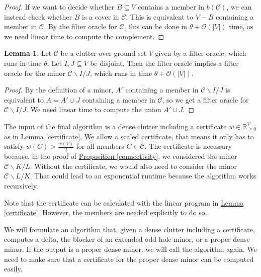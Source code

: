 \documentclass[a4paper, 12pt]{scrbook}
\theoremstyle{definition}
\newtheorem{lemma}[theorem]{Lemma}
\newcommand*{\IR}{\ensuremath{\mathbb{R}}}
\begin{document}
   \begin{proof}
       If we want to decide whether $B \subseteq V$ contains a member in $b(\mathcal{C})$, we can instead check whether $B$ is a cover in $\mathcal{C}$. This is equivalent to $V-B$ containing a member in $\mathcal{C}$. By the filter oracle for $\mathcal{C}$, this can be done in $\theta+\mathcal{O}(|V|)$ time, as we need linear time to compute the complement.
   \end{proof}

   \begin{lemma}
       Let $\mathcal{C}$ be a clutter over ground set $V$ given by a filter oracle, which runs in time $\theta$. Let $I,J \subseteq V$ be disjoint.
       Then the filter oracle implies a filter oracle for the minor $\mathcal{C} \backslash I /J$, which runs in time $\theta+\mathcal{O}(|V|)$.
   \end{lemma}

   \begin{proof}
       By the definition of a minor, $A'$ containing a member in $\mathcal{C} \backslash I / J$ is equivalent to $A = A' \cup J$ containing a member in $\mathcal{C}$, so we get a filter oracle for $\mathcal{C} \backslash I / J$. We need linear time to compute the union $A' \cup J$.
   \end{proof}

   The input of the final algorithm is a dense clutter including a certificate $w \in \IR^V_{\geq 0}$ as in \hyperref[certificate]{Lemma \ref*{certificate}}. We allow a scaled certificate, that means it only has to satisfy $w(C) > \frac {w(V)}{2}$ for all members $C \in \mathcal{C}$. The certificate is necessary because, in the proof of \hyperref[connectivity]{Proposition \ref*{connectivity}}, we considered the minor $\mathcal{C} \backslash K / L$. Without the certificate, we would also need to consider the minor $\mathcal{C}\backslash L / K$. That could lead to an exponential runtime because the algorithm works recursively.

   Note that the certificate can be calculated with the linear program in \hyperref[certificate]{Lemma \ref*{certificate}}. However, the members are needed explicitly to do so.

   We will formulate an algorithm that, given a dense clutter including a certificate, computes a delta, the blocker of an extended odd hole minor, or a proper dense minor. If the output is a proper dense minor, we will call the algorithm again. We need to make sure that a certificate for the proper dense minor can be computed easily.
\end{document}
